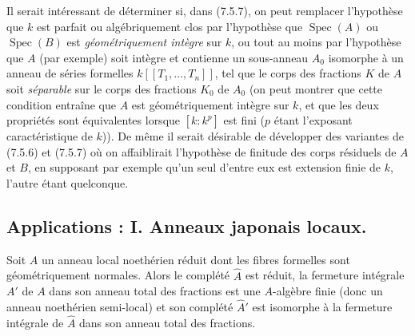 \begin{remark}[7.5.8]
\label{IV.2.s7.5.8-fr}
Il serait intéressant de déterminer si, dans (7.5.7), on peut remplacer
l'hypothèse que $k$ est parfait ou algébriquement clos par l'hypothèse que
$\operatorname{Spec}(A)$ ou $\operatorname{Spec}(B)$ est \emph{géométriquement
intègre} sur $k$, ou tout au moins par l'hypothèse que $A$ (par exemple) soit
intègre et contienne un sous-anneau $A_0$ isomorphe à un anneau de séries
formelles $k[[T_1,\ldots,T_n]]$, tel que le corps des fractions $K$ de $A$ soit
\emph{séparable} sur le corps des fractions $K_0$ de $A_0$ (on peut montrer que cette
condition entraîne que $A$ est géométriquement intègre sur $k$, et que les
deux propriétés sont équivalentes lorsque $[k:k^p]$ est fini ($p$ étant
l'exposant caractéristique de $k$)). De même il serait désirable de développer
des variantes de (7.5.6) et (7.5.7) où on affaiblirait l'hypothèse de finitude
des corps résiduels de $A$ et $B$, en supposant par exemple qu'un seul d'entre
eux est extension finie de $k$, l'autre étant quelconque.
\end{remark}

\subsection{Applications : I. Anneaux japonais locaux.}
\label{IV.2.ss7.6-fr}

\begin{proposition}[7.6.1]
\label{IV.2.s7.6.1-fr}
Soit $A$ un anneau local noethérien réduit dont les fibres formelles sont
géométriquement normales. Alors le complété $\widehat A$ est réduit, la
fermeture intégrale $A'$ de $A$ dans son anneau total des fractions est une
$A$-algèbre finie (donc un anneau noethérien semi-local) et son complété
$\widehat{A}'$ est isomorphe à la fermeture intégrale de $\widehat A$ dans son
anneau total des fractions.
\end{proposition}


